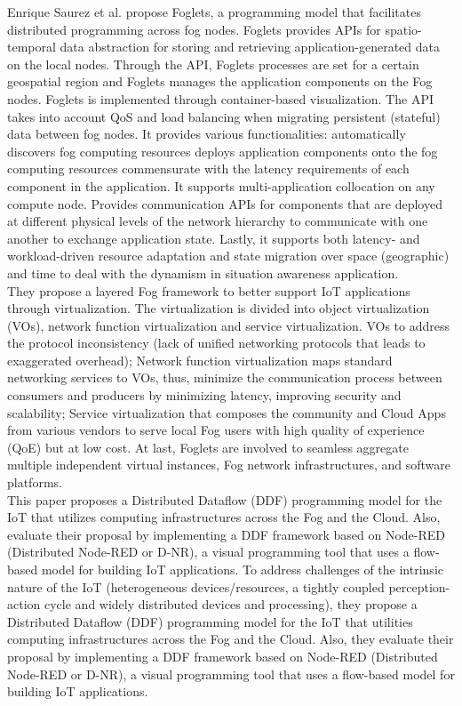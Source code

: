 \cite{saurez2016incremental}
Enrique Saurez et al. propose Foglets, a programming model that facilitates distributed programming across fog nodes. Foglets provides APIs for spatio-temporal data abstraction for storing and retrieving application-generated data on the local nodes. Through the API, Foglets processes are set for a certain geospatial region and Foglets manages the application components on the Fog nodes. Foglets is implemented through container-based visualization. The API takes into account QoS and load balancing when migrating persistent (stateful) data between fog nodes. It provides various functionalities: automatically discovers fog computing resources deploys application components onto the fog computing resources commensurate with the latency requirements of each component in the application. It supports multi-application collocation on any compute node. Provides communication APIs for components that are deployed at different physical levels of the network hierarchy to communicate with one another to exchange application state. Lastly, it supports both latency- and workload-driven resource adaptation and state migration over space (geographic) and time to deal with the dynamism in situation awareness application.\\

\cite{li2018virtual}
They propose a layered Fog framework to better support IoT applications through virtualization. The virtualization is divided into object virtualization  (VOs), network function virtualization and service virtualization. VOs to address the protocol inconsistency (lack of unified networking protocols that leads to exaggerated overhead); Network function virtualization maps standard networking services to VOs, thus, minimize the communication process between consumers and producers by minimizing latency, improving security and scalability; Service virtualization that composes the community and Cloud Apps from various vendors to serve local Fog users with high quality of experience (QoE) but at low cost. At last, Foglets are involved to seamless aggregate multiple independent virtual instances, Fog network infrastructures, and software platforms.\\

\cite{giang2015developing}
This paper proposes a Distributed Dataflow (DDF) programming model for the IoT that utilizes computing infrastructures across the Fog and the Cloud. Also, evaluate their proposal by implementing a DDF framework based on Node-RED (Distributed Node-RED or D-NR), a visual programming tool that uses a flow-based model for building IoT applications. To address challenges of the intrinsic nature of the IoT (heterogeneous devices/resources, a tightly coupled perception-action cycle and widely distributed devices and processing), they propose a Distributed Dataflow (DDF) programming model for the IoT that utilities computing infrastructures across the Fog and the Cloud. Also, they evaluate their proposal by implementing a DDF framework based on Node-RED (Distributed Node-RED or D-NR), a visual programming tool that uses a flow-based model for building IoT applications.\\


